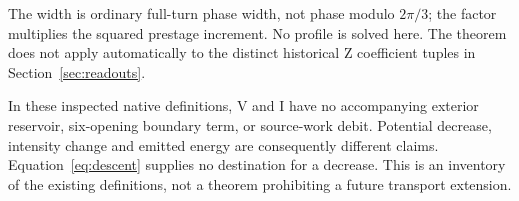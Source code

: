 The width is ordinary full-turn phase width, not phase modulo $2\pi/3$; the factor multiplies the squared prestage increment. No profile is solved here. The theorem does not apply automatically to the distinct historical Z coefficient tuples in Section~\ref{sec:readouts}.

In these inspected native definitions, V and I have no accompanying exterior reservoir, six-opening boundary term, or source-work debit. Potential decrease, intensity change and emitted energy are consequently different claims. Equation~\eqref{eq:descent} supplies no destination for a decrease. This is an inventory of the existing definitions, not a theorem prohibiting a future transport extension.
